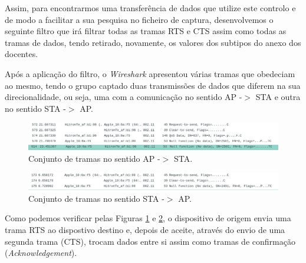     \par Assim, para encontrarmos uma transferência de dados que utilize este controlo e de modo a facilitar a sua pesquisa no ficheiro de captura, desenvolvemos o seguinte filtro que irá filtrar todas as tramas RTS e CTS assim como todas as tramas de dados, tendo retirado, novamente, os valores dos subtipos do anexo dos docentes.
    
    \vspace{20pt}
    \begin{minipage}{\linewidth}
        \centering
    \end{minipage}
    
    
    \vspace{10pt}
    \par Após a aplicação do filtro, o \textit{Wireshark} apresentou várias tramas que obedeciam ao mesmo, tendo o grupo captado duas transmissões de dados que diferem na sua direcionalidade, ou seja, uma com a comunicação no sentido AP -$>$ STA e outra no sentido STA -$>$ AP.
    
    \begin{figure}[H]
    \centering
    \includegraphics[width=500pt]{Prints/Questao7/questao7-AP2STA.png}
    \caption{Conjunto de tramas no sentido AP -$>$ STA.} \label{questao7-ap2sta}
    \end{figure}
    
    \begin{figure}[H]
    \centering
    \includegraphics[width=500pt]{Prints/Questao7/questao7-STA2AP.png}
    \caption{Conjunto de tramas no sentido STA -$>$ AP.} \label{questao7-sta2ap}
    \end{figure}
    
    \par Como podemos verificar pelas Figuras \ref{questao7-ap2sta} e \ref{questao7-sta2ap}, o dispositivo de origem envia uma trama RTS ao dispostivo destino e, depois de aceite, através do envio de uma segunda trama (CTS), trocam dados entre si assim como tramas de confirmação (\textit{Acknowledgement}).
